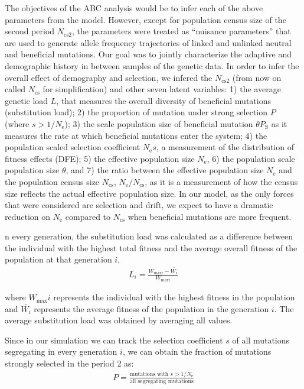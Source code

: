 \documentclass[a4paper, 12pt]{article}
\begin{document}
The objectives of the ABC analysis would be to infer each of the above parameters from the model. However, except for population census size of the second period $N_{\mathrm{cs}2}$, the parameters were treated as ``nuisance parameters'' that are used to generate allele frequency trajectories of linked and unlinked neutral and beneficial mutations. Our goal was to jointly characterize the adaptive and demographic history in between samples of the genetic data. In order to infer the overall effect of demography and selection, we infered the $N_{\mathrm{cs}2}$ (from now on called $N_{\mathrm{cs}}$ for simplification) and other seven latent variables: 1) the average genetic load $L$, that measures the overall diversity of beneficial mutations (substitution load); 2) the proportion of mutation under strong selection $P$ (where $s > 1/N_{\mathrm{e}}$); 3) the scale population size of beneficial mutation $\theta P_{\mathrm{S}}$ as it measures the rate at which beneficial mutations enter the system; 4) the population scaled selection coefficient $N_{\mathrm{e}}s$, a measurement of the distribution of fitness effects (DFE); 5) the effective population size $N_{\mathrm{e}}$, 6) the population scale population size $\theta$, and 7) the ratio between the effective population size $N_{\mathrm{e}}$ and the population census size $N_{\mathrm{cs}}$, $N_{\mathrm{e}}/N_{\mathrm{cs}}$, as it is a measurement of how the census size reflects the actual effective population size. In our model, as the only forces that were considered are selection and drift, we expect to have a dramatic reduction on $N_{\mathrm{e}}$ compared to $N_{\mathrm{cs}}$ when beneficial mutations are more frequent.

n every generation, the substitution load was calculated as a difference between the individual with the highest total fitness and the average overall fitness of the population at that generation $i$,  
\begin{gather*}
    L_{i} = \frac{W_{\mathrm{max}i} - \bar{W_{i}}}{W_{\mathrm{max}i}}
\end{gather*}

where $W_{\mathrm{max}}i$ represents the individual with the highest fitness in the population and $\bar{W_i}$ represents the average fitness of the population in the generation $i$. The average substitution load was obtained by averaging all values.

Since in our simulation we can track the selection coefficient $s$ of all mutations segregating in every generation $i$, we can obtain the fraction of mutations strongly selected in the period 2 as:  
\begin{gather*}
    P = \frac{\text{mutations with } s > 1/N_{\mathrm{e}}}{\text{all segregating mutations}}
\end{gather*}
\end{document}
